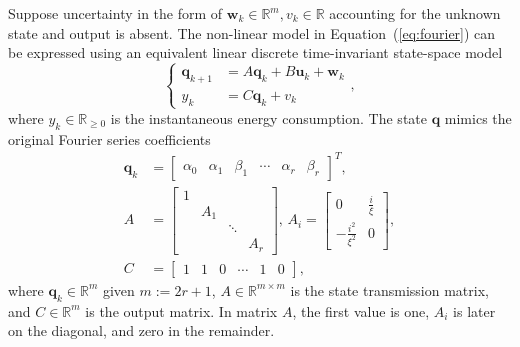 \documentclass[letterpaper,10pt,conference]{ieeeconf}
\theoremstyle{definition}
\begin{document}
Suppose uncertainty in the form of $\mathbf{w}_k\in\mathbb{R}^m,v_k\in\mathbb{R}$ accounting for the unknown state and output is absent. The non-linear model in Equation~(\ref{eq:fourier}) can be expressed using an equivalent linear discrete time-invariant state-space model
\begin{equation}\label{eq:state-perf}\begin{cases}
  \mathbf{q}_{k+1}&=A\mathbf{q}_{k}+B\mathbf{u}_{k}+\mathbf{w}_k\\
  y_k&=C\mathbf{q}_k+v_k
\end{cases},\end{equation}
where $y_k\in\mathbb{R}_{\geq 0}$ is the instantaneous energy consumption. The state $\mathbf{q}$ mimics the original Fourier series coefficients
\begin{equation}\label{eq:state-details}\begin{split}
  \mathbf{q}_k&=\left[\begin{array}{cccccc}
    \alpha_0 & \alpha_1 & \beta_1 & \cdots & \alpha_r & \beta_r
  \end{array}\right]^T,\\
  A&=\left[\begin{array}{cccc}
    1&    &       &  \\
     & A_1&       &  \\
     &    & \ddots&  \\
     &    &       & A_r 
  \end{array}\right],\,A_i=\begin{bmatrix}0 & \frac{i}{\xi} \\ -\frac{i^2}{\xi^2} & 0\end{bmatrix},\\
  C&=\left[\begin{array}{cccccc}
    1 & 1 & 0 & \cdots & 1 & 0
  \end{array}\right],
\end{split}\end{equation}
where $\mathbf{q}_k\in\mathbb{R}^m$ given $m:=2r+1$, $A\in\mathbb{R}^{m\times m}$ is the state transmission matrix, and $C\in\mathbb{R}^m$ is the output matrix. In matrix $A$, the first value is one, $A_i$ is later on the diagonal, and zero in the remainder.
\end{document}
